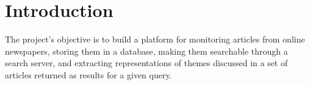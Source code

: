 \chapter{Introduction}\label{ch:in}
The project's objective is to build a platform for monitoring articles from online newspapers, storing them in a database, making them searchable through a search server, and extracting representations of themes discussed in a set of articles returned as results for a given query.
